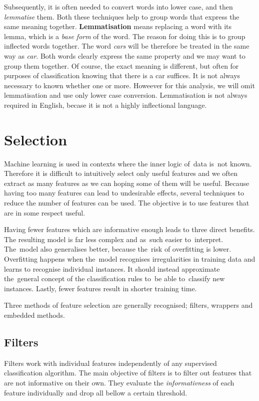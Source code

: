 Subsequently, it is often needed to convert words into lower case, and then {\it lemmatise} them.
Both these techniques help to group words that express the same meaning together.
{\bf Lemmatisation} means replacing a word with its lemma, which is a {\it base form} of the word.
The reason for doing this is to group inflected words together.
The word \textit{cars} will be therefore be treated in the same way as \textit{car}.
Both words clearly express the same property and we may want to group them together.
Of course, the exact meaning is different,
but often for purposes of classification knowing that there is a car suffices.
It is not always necessary to known whether one or more.
Howeever for this analysis, we will omit lemmatisation and use only lower case conversion.
Lemmatisation is not always required in English,
becase it is not a highly inflectional language.

\section{Selection}

Machine learning is used in contexts where the inner logic of~data is~not known.
Therefore it is difficult to intuitively select only useful features
and we often extract as many features as we can hoping some of them will be useful.
Because having too many features can lead to undesirable effects,
several techniques to reduce the number of features can be used.
The objective is to use features that are in some respect useful.

Having fewer features which are informative enough leads to three direct benefits.
The resulting model is far less complex and as~such easier to~interpret.
The~model also generalises better, because the~risk of overfitting is lower.
Overfitting happens when the~model recognises irregularities in training data
and learns to recognise individual instances.
It should instead approximate the~general concept of the classification rules
to~be able to~classify new instances.
Lastly, fewer features result in shorter training time.

Three methods of feature selection are generally recognised; filters, wrappers and embedded methods.

\subsection{Filters}
\label{subsec:filters}

Filters work with individual features independently of any supervised classification algorithm.
The main objective of filters is to filter out features that are not informative on their own.
They evaluate the \textit{informativness} of each feature individually
and drop all bellow a certain threshold.

